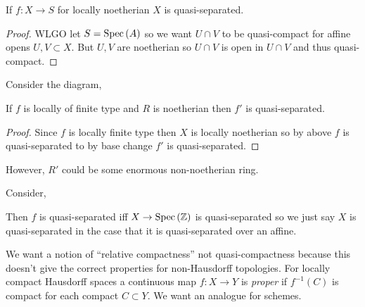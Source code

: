 \documentclass[12pt]{article}
\begin{document}
\begin{prop}
If $f : X \to S$ for locally noetherian $X$ is quasi-separated.
\end{prop}

\begin{proof}
WLGO let $S = \mathrm{Spec}\left( A \right)$ so we want $U \cap V$ to be quasi-compact for affine opens $U, V \subset X$. But $U, V$ are noetherian so $U \cap V$  is open in $U \cap V$ and thus quasi-compact.
\end{proof}

\begin{cor}
Consider the diagram,
\begin{center}
\end{center}
If $f$ is locally of finite type and $R$ is noetherian then $f'$ is quasi-separated.
\end{cor}

\begin{proof}
Since $f$ is locally finite type then $X$ is locally noetherian so by above $f$ is quasi-separated to by base change $f'$ is quasi-separated.
\end{proof}

\begin{rmk}
However, $R'$ could be some enormous non-noetherian ring.
\end{rmk}

\begin{rmk}
Consider,
\begin{center}
\end{center}
Then $f$ is quasi-separated iff $X \to \mathrm{Spec}\left( \mathbb{Z} \right)$ is quasi-separated so we just say $X$ is quasi-separated in the case that it is quasi-separated over an affine.
\end{rmk}
\noindent
We want a notion of ``relative compactness'' not quasi-compactness because this doesn't give the correct properties for non-Hausdorff topologies. For locally compact Hausdorff spaces a continuous map $f :  X \to Y$ is \textit{proper} if $f^{-1}(C)$ is compact for each compact $C \subset Y$. We want an analogue for schemes.
\end{document}
